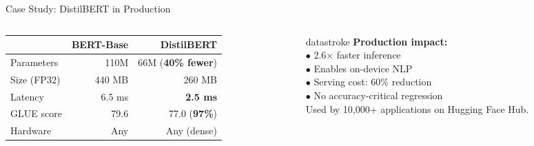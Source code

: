 \documentclass[aspectratio=169, 12pt]{beamer}
\begin{document}
\begin{frame}{Case Study: DistilBERT in Production}
\begin{columns}[T]
\begin{column}{0.52\textwidth}
    \vspace{0.1cm}
    \renewcommand{\arraystretch}{1.1}
    {\scriptsize
    \begin{tabular}{@{}lrr@{}}
      \toprule
      & \textbf{BERT-Base} & \textbf{DistilBERT} \\
      \midrule
      Parameters  & 110M      & 66M (\textbf{40\% fewer}) \\
      Size (FP32) & 440 MB    & 260 MB \\
      Latency     & 6.5 ms    & \textbf{2.5 ms} \\
      GLUE score  & 79.6      & 77.0 (\textbf{97\%}) \\
      Hardware    & Any       & Any (dense) \\
      \bottomrule
    \end{tabular}
    }

    \vspace{0.1cm}
  \end{column}
  \begin{column}{0.45\textwidth}
    \vspace{0.1cm}
    \begin{mlsyscard}{datastroke}
    {\scriptsize \textbf{Production impact:}\\[0.05cm]
    $\bullet$ 2.6$\times$ faster inference\\
    $\bullet$ Enables on-device NLP\\
    $\bullet$ Serving cost: 60\% reduction\\
    $\bullet$ No accuracy-critical regression\\[0.05cm]
    Used by 10,000+ applications on Hugging Face Hub.}
    \end{mlsyscard}

    \vspace{0.1cm}
  \end{column}
\end{columns}

\end{frame}
\end{document}
